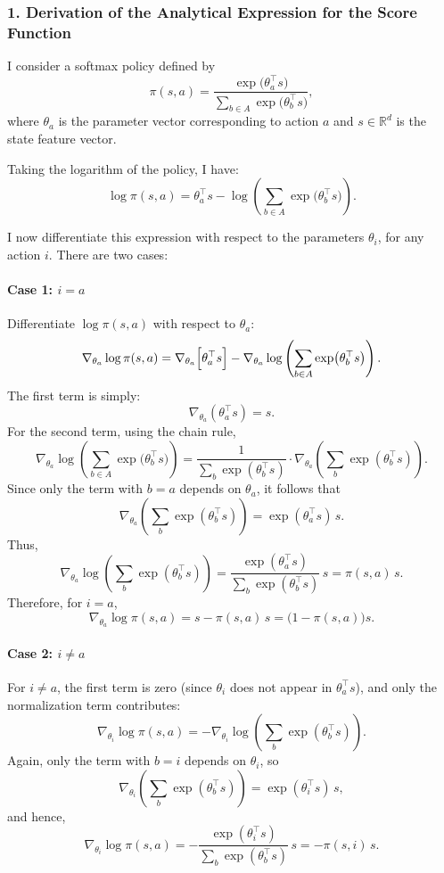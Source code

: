 \subsubsection*{1. Derivation of the Analytical Expression for the Score Function}

I consider a softmax policy defined by
\[
\pi(s,a) = \frac{\exp\bigl(\theta_a^\top s\bigr)}{\sum_{b \in A} \exp\bigl(\theta_b^\top s\bigr)},
\]
where $\theta_a$ is the parameter vector corresponding to action $a$ and $s\in\mathbb{R}^{d}$ is the state feature vector.

Taking the logarithm of the policy, I have:
\[
\log \pi(s,a) = \theta_a^\top s - \log\left(\sum_{b \in A} \exp\bigl(\theta_b^\top s\bigr)\right).
\]

I now differentiate this expression with respect to the parameters $\theta_i$, for any action $i$. There are two cases:

\paragraph{Case 1: $i=a$}  
Differentiate $\log \pi(s,a)$ with respect to $\theta_a$:
\[
\nabla_{\theta_a} \log \pi(s,a) = \nabla_{\theta_a}\Bigl[\theta_a^\top s\Bigr] - \nabla_{\theta_a}\log\left(\sum_{b \in A} \exp\bigl(\theta_b^\top s\bigr)\right).
\]
The first term is simply:
\[
\nabla_{\theta_a} (\theta_a^\top s) = s.
\]
For the second term, using the chain rule,
\[
\nabla_{\theta_a} \log\left(\sum_{b \in A} \exp\bigl(\theta_b^\top s\bigr)\right)
=\frac{1}{\sum_{b} \exp(\theta_b^\top s)} \cdot \nabla_{\theta_a} \left(\sum_{b} \exp(\theta_b^\top s)\right).
\]
Since only the term with $b=a$ depends on $\theta_a$, it follows that
\[
\nabla_{\theta_a} \left(\sum_{b} \exp(\theta_b^\top s)\right) = \exp(\theta_a^\top s)\, s.
\]
Thus,
\[
\nabla_{\theta_a} \log\left(\sum_{b} \exp(\theta_b^\top s)\right)
=\frac{\exp(\theta_a^\top s)}{\sum_{b} \exp(\theta_b^\top s)}\, s = \pi(s,a)\, s.
\]
Therefore, for $i=a$,
\[
\nabla_{\theta_a} \log \pi(s,a) = s - \pi(s,a) \, s = \bigl(1 - \pi(s,a)\bigr) s.
\]

\paragraph{Case 2: $i\neq a$}  
For $i \neq a$, the first term is zero (since $\theta_i$ does not appear in $\theta_a^\top s$), and only the normalization term contributes:
\[
\nabla_{\theta_i} \log \pi(s,a) = -\nabla_{\theta_i} \log\left(\sum_{b} \exp(\theta_b^\top s)\right).
\]
Again, only the term with $b=i$ depends on $\theta_i$, so
\[
\nabla_{\theta_i}\left(\sum_{b} \exp(\theta_b^\top s)\right) = \exp(\theta_i^\top s)\, s,
\]
and hence,
\[
\nabla_{\theta_i} \log \pi(s,a) = -\frac{\exp(\theta_i^\top s)}{\sum_{b} \exp(\theta_b^\top s)}\, s = -\pi(s,i)\, s.
\]

